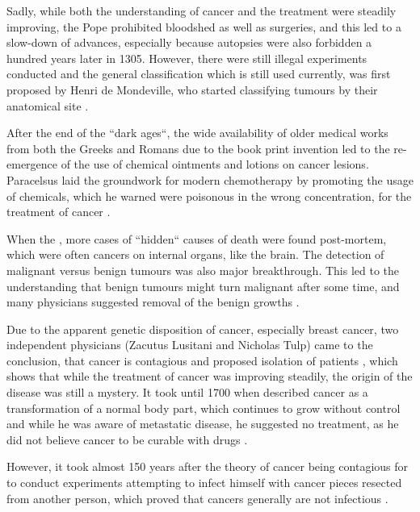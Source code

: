 Sadly, while both the understanding of cancer and the treatment were steadily improving, the Pope prohibited bloodshed as well as surgeries, and this led to a slow-down of advances, especially because autopsies were also forbidden a hundred years later in 1305. However, there were still illegal experiments conducted and the general classification which is still used currently, was first proposed by Henri de Mondeville, who started classifying tumours by their anatomical site \cite{Pilcher1895}.

After the end of the ``dark ages``, the wide availability of older medical works from both the Greeks and Romans due to the book print invention led to the re-emergence of the use of chemical ointments and lotions on cancer lesions. Paracelsus laid the groundwork for  modern chemotherapy by promoting the usage of chemicals, which he  warned were poisonous in the wrong concentration, for the treatment of cancer \cite{PHT1562}.

When the , more  cases of ``hidden`` causes of death were found post-mortem, which were often cancers on internal organs, like the brain. The detection of malignant versus benign tumours was also  major breakthrough. This led to the understanding that  benign tumours might turn malignant after some time, and many physicians suggested  removal of the benign growths \cite{Severino1632}.

Due to the apparent genetic disposition of cancer, especially breast cancer, two independent physicians (Zacutus Lusitani and Nicholas Tulp) came to the conclusion, that cancer is contagious and proposed  isolation of patients \cite{Lusitani1649,Tulpii1652}, which shows that while the treatment of cancer was improving steadily, the origin of the disease was still a mystery. It took until 1700 when \citeauthor{DeshaiesGendron1701} described cancer as a transformation of a normal body part, which continues to grow without control and while he was aware of metastatic disease, he suggested no treatment, as he did not believe cancer to be curable with drugs \cite{DeshaiesGendron1701}. 

However, it took almost 150 years after the theory of cancer being contagious for \textcite{Nooth1804} to conduct experiments attempting to infect himself with cancer pieces resected from another person, which proved that cancers generally are not infectious \cite{Nooth1804}.

